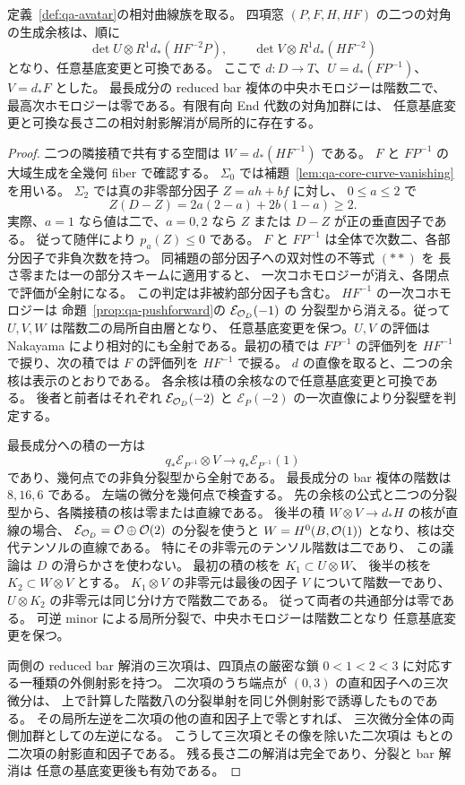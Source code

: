 \begin{proposition}[捩れを保持する窓の相対対角積]
\label{prop:qa-avatar-twisted-pencil-window}
定義~\ref{def:qa-avatar}の相対曲線族を取る。
四項窓 $(P,F,H,HF)$ の二つの対角の生成余核は、順に
\[
 \det U\otimes R^1d_*(HF^{-2}P),\qquad
 \det V\otimes R^1d_*(HF^{-2})
\]
となり、任意基底変更と可換である。
ここで $d:D\to T$、$U=d_*(FP^{-1})$、$V=d_*F$ とした。
最長成分の reduced bar 複体の中央ホモロジーは階数二で、
最高次ホモロジーは零である。有限有向 End 代数の対角加群には、
任意基底変更と可換な長さ二の相対射影解消が局所的に存在する。
\end{proposition}
\begin{proof}
二つの隣接積で共有する空間は $W=d_*(HF^{-1})$ である。
$F$ と $FP^{-1}$ の大域生成を全幾何 fiber で確認する。
$\Sigma_0$ では補題~\ref{lem:qa-core-curve-vanishing}を用いる。
$\Sigma_2$ では真の非零部分因子 $Z=ah+bf$ に対し、
$0\leq a\leq2$ で
\[
 Z(D-Z)=2a(2-a)+2b(1-a)\geq2.
\]
実際、$a=1$ なら値は二で、$a=0,2$ なら
$Z$ または $D-Z$ が正の垂直因子である。
従って随伴により $p_a(Z)\leq0$ である。
$F$ と $FP^{-1}$ は全体で次数二、各部分因子で非負次数を持つ。
同補題の部分因子への双対性の不等式 $(**)$ を
長さ零または一の部分スキームに適用すると、
一次コホモロジーが消え、各閉点で評価が全射になる。
この判定は非被約部分因子も含む。
$HF^{-1}$ の一次コホモロジーは
命題~\ref{prop:qa-pushforward}の $\mathcal E_{\mathcal O_D}(-1)$ の
分裂型から消える。従って $U,V,W$ は階数二の局所自由層となり、
任意基底変更を保つ。$U,V$ の評価は Nakayama により相対的にも全射である。最初の積では $FP^{-1}$ の評価列を
$HF^{-1}$ で捩り、次の積では $F$ の評価列を $HF^{-1}$ で捩る。
$d$ の直像を取ると、二つの余核は表示のとおりである。
各余核は積の余核なので任意基底変更と可換である。
後者と前者はそれぞれ $\mathcal E_{\mathcal O_D}(-2)$ と
$\mathcal E_P(-2)$ の一次直像により分裂壁を判定する。

最長成分への積の一方は
\[
 q_*\mathcal E_{P^{-1}}\otimes V
     \longrightarrow q_*\mathcal E_{P^{-1}}(1)
\]
であり、幾何点での非負分裂型から全射である。
最長成分の bar 複体の階数は $8,16,6$ である。
左端の微分を幾何点で検査する。
先の余核の公式と二つの分裂型から、各隣接積の核は零または直線である。
後半の積 $W\otimes V\to d_*H$ の核が直線の場合、
$\mathcal E_{\mathcal O_D}=\mathcal O\oplus\mathcal O(2)$ の分裂を使うと
$W=H^0(B,\mathcal O(1))$ となり、核は交代テンソルの直線である。
特にその非零元のテンソル階数は二であり、
この議論は $D$ の滑らかさを使わない。
最初の積の核を $K_1\subset U\otimes W$、
後半の核を $K_2\subset W\otimes V$ とする。
$K_1\otimes V$ の非零元は最後の因子 $V$ について階数一であり、
$U\otimes K_2$ の非零元は同じ分け方で階数二である。
従って両者の共通部分は零である。
可逆 minor による局所分裂で、中央ホモロジーは階数二となり
任意基底変更を保つ。

両側の reduced bar 解消の三次項は、四頂点の厳密な鎖
$0<1<2<3$ に対応する一種類の外側射影を持つ。
二次項のうち端点が $(0,3)$ の直和因子への三次微分は、
上で計算した階数八の分裂単射を同じ外側射影で誘導したものである。
その局所左逆を二次項の他の直和因子上で零とすれば、
三次微分全体の両側加群としての左逆になる。
こうして三次項とその像を除いた二次項は
もとの二次項の射影直和因子である。
残る長さ二の解消は完全であり、分裂と bar 解消は
任意の基底変更後も有効である。
\end{proof}

